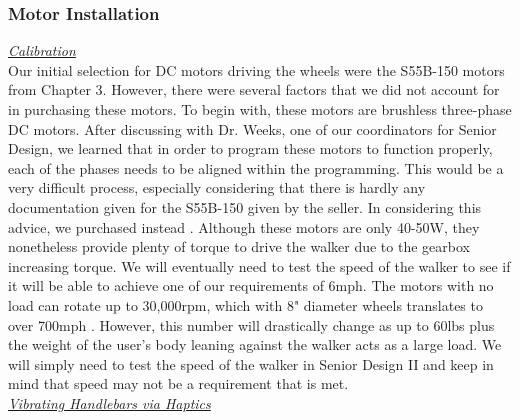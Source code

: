 \subsubsection{Motor Installation}
\noindent \underline{\textit{Calibration}}\\
\noindent Our initial selection for DC motors driving the wheels were the S55B-150 motors from Chapter 3. However, there were several factors that we did not account for in purchasing these motors. To begin with, these motors are brushless three-phase DC motors. After discussing with Dr. Weeks, one of our coordinators for Senior Design, we learned that in order to program these motors to function properly, each of the phases needs to be aligned within the programming. This would be a very difficult process, especially considering that there is hardly any documentation given for the S55B-150 given by the seller. In considering this advice, we purchased instead \cite{amazon12024}. Although these motors are only 40-50W, they nonetheless provide plenty of torque to drive the walker due to the gearbox increasing torque. We will eventually need to test the speed of the walker to see if it will be able to achieve one of our requirements of 6mph. The motors with no load can rotate up to 30,000rpm, which with 8" diameter wheels translates to over 700mph \cite{lucidar2024}. However, this number will drastically change as up to 60lbs plus the weight of the user's body leaning against the walker acts as a large load. We will simply need to test the speed of the walker in Senior Design II and keep in mind that speed may not be a requirement that is met.\\


\noindent \underline{\textit{Vibrating Handlebars via Haptics}}\\

